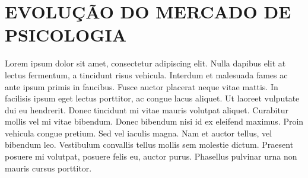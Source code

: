\chapter{EVOLUÇÃO DO MERCADO DE PSICOLOGIA}
\label{chap:evolucaoPsicologia}

Lorem ipsum dolor sit amet, consectetur adipiscing elit. Nulla dapibus elit at lectus fermentum, a tincidunt risus vehicula. Interdum et malesuada fames ac ante ipsum primis in faucibus. Fusce auctor placerat neque vitae mattis. In facilisis ipsum eget lectus porttitor, ac congue lacus aliquet. Ut laoreet vulputate dui eu hendrerit. Donec tincidunt mi vitae mauris volutpat aliquet. Curabitur mollis vel mi vitae bibendum. Donec bibendum nisi id ex eleifend maximus. Proin vehicula congue pretium. Sed vel iaculis magna. Nam et auctor tellus, vel bibendum leo. Vestibulum convallis tellus mollis sem molestie dictum. Praesent posuere mi volutpat, posuere felis eu, auctor purus. Phasellus pulvinar urna non mauris cursus porttitor.